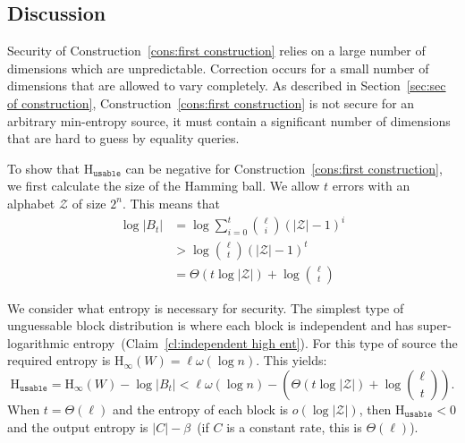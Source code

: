 \documentclass[11pt]{article}
\newcommand{\secref}[1]{\mbox{Section~\ref{#1}}}
\newcommand{\lemref}[1]{\mbox{Lemma~\ref{#1}}}
\newcommand{\clref}[1]{\mbox{Claim~\ref{#1}}}
\newcommand{\consref}[1]{\mbox{Construction~\ref{#1}}}
\newcommand{\Hoo}{\mathrm{H}_\infty}
\newcommand{\Huse}{\mathrm{H}_{\mathtt{usable}}}
\newcommand{\authnote}[2]{{\textcolor{red}{\textsf{#1 notes: }\textcolor{blue}{ #2}}\marginpar{\textcolor{red}{\textbf{!!!!!}}}}}
\newcommand{\authnote}[2]{}
\newcommand{\bnote}[1]{{\authnote{Ben}{#1}}}
\begin{document}
%
%


\subsection{Discussion}
\label{sec:discussion}
Security of \consref{cons:first construction} relies on a large number of dimensions which are unpredictable.  Correction occurs for a small number of dimensions that are allowed to vary completely.  As described in \secref{sec:sec of construction}, \consref{cons:first construction} is not secure for an arbitrary min-entropy source, it must contain a significant number of dimensions that are hard to guess by equality queries.

To show that $\Huse$ can be negative for \consref{cons:first construction}, we first calculate the size of the Hamming ball.  We allow $t$ errors with an alphabet $\mathcal{Z}$ of size $2^n$.  This means that
\begin{align*}
\log |B_t| &= \log \sum_{i=0}^t {\ell \choose i} (|\mathcal{Z}|-1)^i\\
&> \log {\ell \choose t} (|\mathcal{Z}|-1)^t\\
& =\Theta(t\log |\mathcal{Z}|) + \log {\ell\choose t}
\end{align*}

We consider what entropy is necessary for security.  The simplest type of unguessable block distribution is where each block is independent and has super-logarithmic entropy~(\clref{cl:independent high ent}).  For this type of source the required entropy is $\Hoo(W) = \ell\omega(\log n)$.  This yields:
\[
\Huse = \Hoo(W) - \log |B_t| < \ell \omega(\log n) -\left( \Theta(t\log |\mathcal{Z}|) + \log {\ell \choose t}\right).
\]
When $t =\Theta(\ell)$ and the entropy of each block is $o(\log |\mathcal{Z}|)$, then $\Huse<0$ and the output entropy is $|C| -\beta$~(if $C$ is a constant rate, this is $\Theta(\ell)$).
\end{document}
